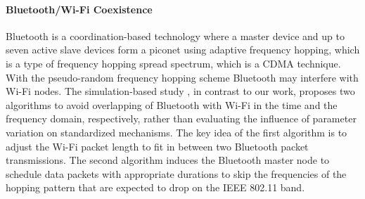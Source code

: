 \paragraph{Bluetooth/Wi-Fi Coexistence}
Bluetooth is a coordination-based technology where a master device and up to seven active slave devices form a piconet using adaptive frequency hopping, which is a type of frequency hopping spread spectrum, which is a CDMA technique. With the pseudo-random frequency hopping scheme Bluetooth may interfere with Wi-Fi nodes. The simulation-based study \cite{chiasserini02}, in contrast to our work, proposes two algorithms to avoid overlapping of Bluetooth with Wi-Fi in the time and the frequency domain, respectively, rather than evaluating the influence of parameter variation on standardized mechanisms. The key idea of the first algorithm is to adjust the Wi-Fi packet length to fit in between two Bluetooth packet transmissions. The second algorithm induces the Bluetooth master node to schedule data packets with appropriate durations to skip the frequencies of the hopping pattern that are expected to drop on the IEEE 802.11 band.

%
%
%


